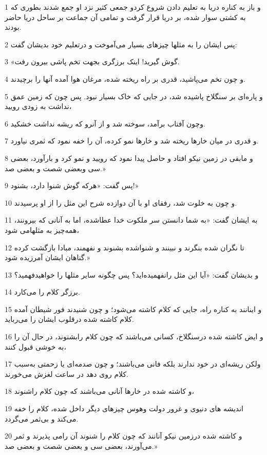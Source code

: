 \par 1 و باز به کناره دریا به تعلیم دادن شروع کردو جمعی کثیر نزد او جمع شدند بطوری که به کشتی سوار شده، بر دریا قرار گرفت و تمامی آن جماعت بر ساحل دریا حاضر بودند.
\par 2 پس ایشان را به مثلها چیزهای بسیار می‌آموخت و درتعلیم خود بدیشان گفت:
\par 3 «گوش گیرید! اینک برزگری بجهت تخم پاشی بیرون رفت.
\par 4 و چون تخم می‌پاشید، قدری بر راه ریخته شده، مرغان هوا آمده آنها را برچیدند.
\par 5 و پاره‌ای بر سنگلاخ پاشیده شد، در جایی که خاک بسیار نبود. پس چون که زمین عمق نداشت به زودی رویید،
\par 6 وچون آفتاب برآمد، سوخته شد و از آنرو که ریشه نداشت خشکید.
\par 7 و قدری در میان خارها ریخته شد و خارها نمو کرده، آن را خفه نمود که ثمری نیاورد.
\par 8 و مابقی در زمین نیکو افتاد و حاصل پیدا نمود که رویید و نمو کرد و بارآورد، بعضی سی وبعضی شصت و بعضی صد.»
\par 9 پس گفت: «هر‌که گوش شنوا دارد، بشنود!»
\par 10 و چون به خلوت شد، رفقای او با آن دوازده شرح این مثل را از او پرسیدند.
\par 11 به ایشان گفت: «به شما دانستن سر ملکوت خدا عطاشده، اما به آنانی که بیرونند، همه‌چیز به مثلهامی شود،
\par 12 تا نگران شده بنگرند و نبینند و شنواشده بشنوند و نفهمند، مبادا بازگشت کرده گناهان ایشان آمرزیده شود.»
\par 13 و بدیشان گفت: «آیا این مثل رانفهمیده‌اید؟ پس چگونه سایر مثلها را خواهیدفهمید؟
\par 14 برزگر کلام را می‌کارد.
\par 15 و اینانند به کناره راه، جایی که کلام کاشته می‌شود؛ و چون شنیدند فور شیطان آمده کلام کاشته شده درقلوب ایشان را می‌رباید.
\par 16 و ایض کاشته شده درسنگلاخ، کسانی می‌باشند که چون کلام رابشنوند، در حال آن را به خوشی قبول کنند،
\par 17 ولکن ریشه‌ای در خود ندارند بلکه فانی می‌باشند؛ و چون صدمه‌ای یا زحمتی به‌سبب کلام روی دهد در ساعت لغزش می‌خورند.
\par 18 و کاشته شده در خارها آنانی می‌باشند که چون کلام راشنوند،
\par 19 اندیشه های دنیوی و غرور دولت وهوس چیزهای دیگر داخل شده، کلام را خفه می‌کند و بی‌ثمر می‌گردد.
\par 20 و کاشته شده درزمین نیکو آنانند که چون کلام را شنوند آن رامی پذیرند و ثمر می‌آورند، بعضی سی و بعضی شصت و بعضی صد.»
